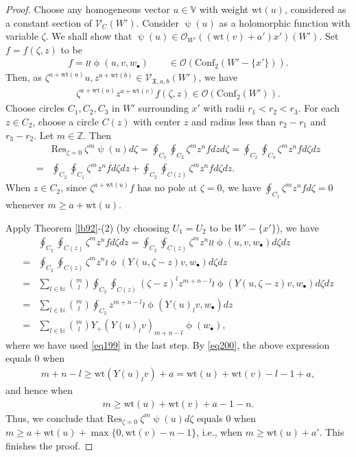 \documentclass[12pt,b5paper,notitlepage]{report}
\theoremstyle{definition}
\theoremstyle{plain}
\newcommand{\fk}{\mathfrak}
\newcommand{\Conf}{\mathrm{Conf}}
\newcommand{\Res}{\mathrm{Res}}
\newcommand{\scr}{\mathscr}
\newcommand{\blt}{\bullet}
\newcommand{\Vbb}{\mathbb V}
\newcommand{\Nbb}{\mathbb N}
\newcommand{\Zbb}{\mathbb Z}
\newcommand{\wt}{\mathrm{wt}}
\numberwithin{equation}{section}
\begin{document}
\begin{proof}
Choose any homogeneous vector $u\in\Vbb$ with weight $\wt(u)$, considered as a constant section of $\scr V_C(W')$.  Consider $\uppsi(u)$ as a holomorphic function with variable $\zeta$. We shall show that $\uppsi(u)\in\scr O_{W'}((\wt(v)+a')x')(W')$. Set $f=f(\zeta,z)$ to be
\begin{align*}
f=\wr\wr\upphi(u,v,w_\blt)\qquad\in\scr O(\Conf_2(W'-\{x'\})).
\end{align*}
Then, as $\zeta^{a+\wt(u)}u,z^{a+\wt(b)}\in\scr V_{\fk X,a,b}(W')$, we have
\begin{align*}
\zeta^{a+\wt(u)}z^{a+\wt(v)}f(\zeta,z)\in\scr O(\Conf_2(W')).
\end{align*}
Choose circles $C_1,C_2,C_3$ in $W'$ surrounding $x'$ with radii $r_1<r_2<r_3$. For each $z\in C_2$, choose a circle $C(z)$ with center $z$ and radius less than $r_2-r_1$ and $r_3-r_2$. Let $m\in\Zbb$.  Then
\begin{align*}
&\Res_{\zeta=0}~\zeta^m\uppsi(u)d\zeta=\oint_{C_3}\oint_{C_2}\zeta^mz^nfdzd\zeta=\oint_{C_2}\oint_{C_3}\zeta^mz^nfd\zeta dz\\
=&\oint_{C_2}\oint_{C_1}\zeta^mz^nfd\zeta dz+\oint_{C_2}\oint_{C(z)}\zeta^mz^nfd\zeta dz.
\end{align*}
When $z\in C_2$, since $\zeta^{a+\wt(u)}f$ has no pole at $\zeta=0$, we have $\oint_{C_1}\zeta^mz^nfd\zeta=0$ whenever $m\geq a+\wt(u)$. 

Apply Theorem \ref{lb92}-(2) (by choosing $U_1=U_2$ to be $W'-\{x'\}$), we have
\begin{align*}
&\oint_{C_2}\oint_{C(z)}\zeta^mz^nfd\zeta dz=\oint_{C_2}\oint_{C(z)}\zeta^mz^n\wr\wr\upphi(u,v,w_\blt)d\zeta dz\\
=&\oint_{C_2}\oint_{C(z)}\zeta^mz^n\wr\upphi(Y(u,\zeta-z)v,w_\blt)d\zeta dz\\
=&\sum_{l\in\Nbb}{m\choose  l}\oint_{C_2}\oint_{C(z)}(\zeta-z)^lz^{m+n-l}\wr\upphi(Y(u,\zeta-z)v,w_\blt)d\zeta dz\\
=&\sum_{l\in\Nbb}{m\choose  l}\oint_{C_2}z^{m+n-l}\wr\upphi(Y(u)_lv,w_\blt)dz\\
=&\sum_{l\in\Nbb}{m\choose  l}Y_+(Y(u)_lv)_{m+n-l}\upphi(w_\blt),
\end{align*}
where we have used \eqref{eq199} in the last step. By \eqref{eq200}, the above expression equals $0$ when
\begin{align*}
m+n-l\geq\wt(Y(u)_lv)+a=\wt(u)+\wt(v)-l-1+a,
\end{align*}
and hence when
\begin{align*}
m\geq \wt(u)+\wt(v)+a-1-n.
\end{align*}
Thus, we conclude that $\Res_{\zeta=0}~\zeta^m\uppsi(u)d\zeta$ equals $0$ when $m\geq a+\wt(u)+\max\{0,\wt(v)-n-1\}$, i.e., when $m\geq \wt(u)+a'$. This finishes the proof.
\end{proof}
\end{document}
